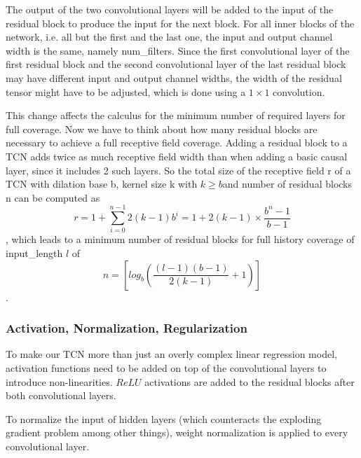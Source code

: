 The output of the two convolutional layers will be added to the input of the residual block to produce the input for the next block. For all inner blocks of the network, i.e. all but the first and the last one, the input and output channel width is the same, namely num\_filters. Since the first convolutional layer of the first residual block and the second convolutional layer of the last residual block may have different input and output channel widths, the width of the residual tensor might have to be adjusted, which is done using a $1\times1$ convolution.

This change affects the calculus for the minimum number of required layers for full coverage. Now we have to think about how many residual blocks are necessary to achieve a full receptive field coverage. Adding a residual block to a TCN adds twice as much receptive field width than when adding a basic causal layer, since it includes 2 such layers. So the total size of the receptive field r of a TCN with dilation base b, kernel size k with $k \geq b $and number of residual blocks n can be computed as $$r = 1 + \sum_{i=0}^{n-1}2(k-1)b^i=1+2(k-1)\times \frac{b^n-1}{b-1}$$, which leads to a minimum number of residual blocks  for full history coverage of input\_length $l$ of $$n=\left[log_b(\frac{(l-1)(b-1)}{2(k-1)}+1)\right]$$.

\subsubsection{Activation, Normalization, Regularization}
To make our TCN more than just an overly complex linear regression model, activation functions need to be added on top of the convolutional layers to introduce non-linearities. $ReLU$ activations are added to the residual blocks after both convolutional layers.

To normalize the input of hidden layers (which counteracts the exploding gradient problem among other things), weight normalization is applied to every convolutional layer.

